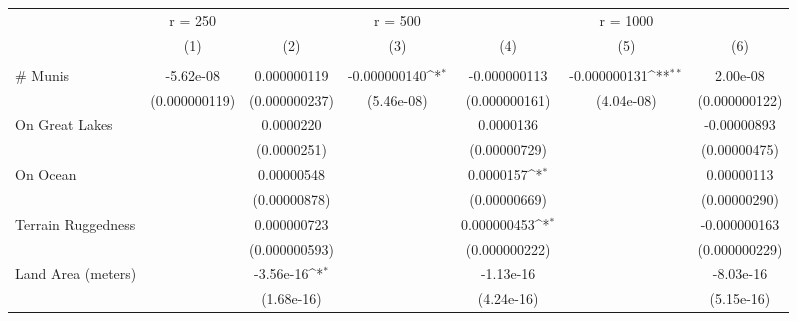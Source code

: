 {
\def\sym#1{\ifmmode^{#1}\else\(^{#1}\)\fi}
\begin{tabular}{l*{6}{c}}
\hline\hline
                    &     r = 250         &                     &     r = 500         &                     &    r = 1000         &                     \\
                    &\multicolumn{1}{c}{(1)}&\multicolumn{1}{c}{(2)}&\multicolumn{1}{c}{(3)}&\multicolumn{1}{c}{(4)}&\multicolumn{1}{c}{(5)}&\multicolumn{1}{c}{(6)}\\
                    &\multicolumn{1}{c}{} &\multicolumn{1}{c}{} &\multicolumn{1}{c}{} &\multicolumn{1}{c}{} &\multicolumn{1}{c}{} &\multicolumn{1}{c}{} \\
\hline
\# Munis            &   -5.62e-08         & 0.000000119         &-0.000000140\sym{*}  &-0.000000113         &-0.000000131\sym{**} &    2.00e-08         \\
                    &(0.000000119)         &(0.000000237)         &  (5.46e-08)         &(0.000000161)         &  (4.04e-08)         &(0.000000122)         \\
[1em]
On Great Lakes      &                     &   0.0000220         &                     &   0.0000136         &                     & -0.00000893         \\
                    &                     & (0.0000251)         &                     &(0.00000729)         &                     &(0.00000475)         \\
[1em]
On Ocean            &                     &  0.00000548         &                     &   0.0000157\sym{*}  &                     &  0.00000113         \\
                    &                     &(0.00000878)         &                     &(0.00000669)         &                     &(0.00000290)         \\
[1em]
Terrain Ruggedness  &                     & 0.000000723         &                     & 0.000000453\sym{*}  &                     &-0.000000163         \\
                    &                     &(0.000000593)         &                     &(0.000000222)         &                     &(0.000000229)         \\
[1em]
Land Area (meters)  &                     &   -3.56e-16\sym{*}  &                     &   -1.13e-16         &                     &   -8.03e-16         \\
                    &                     &  (1.68e-16)         &                     &  (4.24e-16)         &                     &  (5.15e-16)         \\

\end{tabular}}
